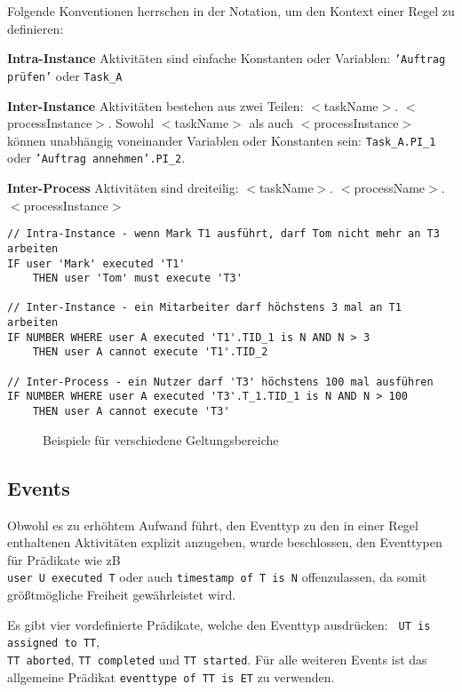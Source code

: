 Folgende Konventionen herrschen in der Notation, um den Kontext einer Regel zu definieren:

\textbf{Intra-Instance} Aktivitäten sind einfache Konstanten oder Variablen: \texttt{'Auftrag prüfen'} oder \texttt{Task\_A}

\textbf{Inter-Instance} Aktivitäten bestehen aus zwei Teilen:  $<$taskName$>$. $<$processInstance$>$. Sowohl $<$taskName$>$ als auch  $<$processInstance$>$ können unabhängig voneinander Variablen oder Konstanten sein: \texttt{Task\_A.PI\_1} oder \texttt{'Auftrag annehmen'.PI\_2}.

\textbf{Inter-Process} Aktivitäten sind dreiteilig:  $<$taskName$>$. $<$processName$>$. $<$processInstance$>$

\begin{verbatim}
// Intra-Instance - wenn Mark T1 ausführt, darf Tom nicht mehr an T3 arbeiten
IF user 'Mark' executed 'T1'
    THEN user 'Tom' must execute 'T3'

// Inter-Instance - ein Mitarbeiter darf höchstens 3 mal an T1 arbeiten
IF NUMBER WHERE user A executed 'T1'.TID_1 is N AND N > 3
    THEN user A cannot execute 'T1'.TID_2

// Inter-Process - ein Nutzer darf 'T3' höchstens 100 mal ausführen
IF NUMBER WHERE user A executed 'T3'.T_1.TID_1 is N AND N > 100
    THEN user A cannot execute 'T3'
\end{verbatim}
\begin{figure}[!h]
\caption{Beispiele für verschiedene Geltungsbereiche}
\label{fig:exampleinterinstance}
\end{figure}

\subsection{Events}
Obwohl es zu erhöhtem Aufwand führt, den Eventtyp zu den in einer Regel enthaltenen Aktivitäten explizit anzugeben, wurde beschlossen, den Eventtypen für Prädikate wie zB \\\texttt{user U executed T} oder auch \texttt{timestamp of T is N} offenzulassen, da somit größtmögliche Freiheit gewährleistet wird. 

Es gibt vier vordefinierte Prädikate, welche den Eventtyp ausdrücken: \texttt{ UT is assigned to TT},\\
\texttt{TT aborted}, \texttt{TT completed} und \texttt{TT started}. Für alle weiteren Events ist das allgemeine Prädikat \texttt{eventtype of TT is ET} zu verwenden.

